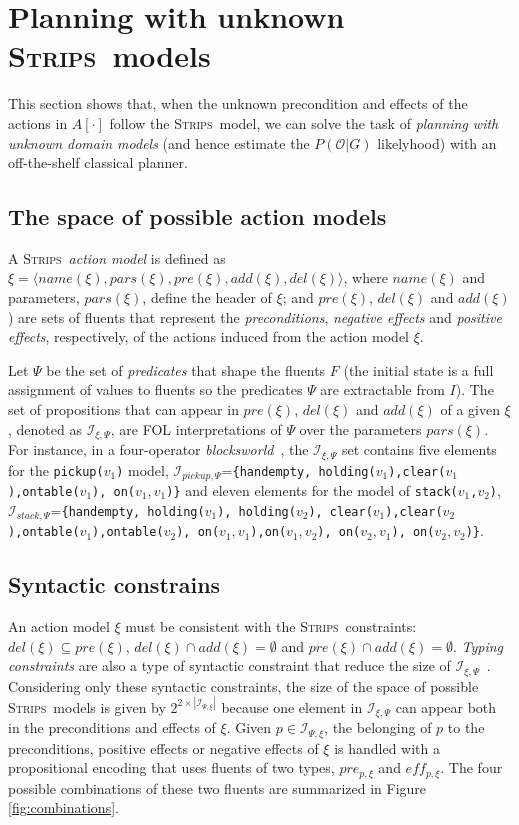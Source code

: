 \documentclass[letterpaper]{article} %
\newcommand{\tup}[1]{{\langle #1 \rangle}}
\newcommand{\strips}{\textsc{Strips}}     %
\begin{document}
\section{Planning with unknown \strips\ models}
\label{sec:planning}
This section shows that, when the unknown precondition and effects of the actions in $A[\cdot]$ follow the \strips\ model, we can solve the task of {\em planning with unknown domain models} (and hence estimate the $P(\mathcal{O}|G)$ likelyhood) with an off-the-shelf classical planner.

\subsection{The space of possible action models}
A \strips\ \emph{action model} is defined as $\xi=\tup{name(\xi),pars(\xi),pre(\xi),add(\xi),del(\xi)}$, where $name(\xi)$ and parameters, $pars(\xi)$, define the header of $\xi$; and $pre(\xi)$, $del(\xi)$ and $add(\xi)$) are sets of fluents that represent the {\em preconditions}, {\em negative effects} and {\em positive effects}, respectively, of the actions induced from the action model $\xi$.

Let $\Psi$ be the set of {\em predicates} that shape the fluents $F$ (the initial state is a full assignment of values to fluents so the predicates $\Psi$ are extractable from $I$). The set of propositions that can appear in $pre(\xi)$, $del(\xi)$ and $add(\xi)$ of a given $\xi$, denoted as ${\mathcal I}_{\xi,\Psi}$, are FOL interpretations of $\Psi$ over the parameters $pars(\xi)$. For instance, in a four-operator {\em blocksworld}~\cite{slaney2001blocks}, the ${\mathcal I}_{\xi,\Psi}$ set contains five elements for the {\small \tt pickup($v_1$)} model, ${\mathcal I}_{pickup,\Psi}$={\small\tt\{handempty, holding($v_1$),clear($v_1$),ontable($v_1$), on($v_1,v_1$)\}} and eleven elements for the model of {\small \tt stack($v_1$,$v_2$)}, ${\mathcal I}_{stack,\Psi}$={\small\tt\{handempty, holding($v_1$), holding($v_2$), clear($v_1$),clear($v_2$),ontable($v_1$),ontable($v_2$), on($v_1,v_1$),on($v_1,v_2$), on($v_2,v_1$), on($v_2,v_2$)\}}. 

\subsection{Syntactic constrains}
An action model $\xi$ must be consistent with the \strips\ constraints: $del(\xi)\subseteq pre(\xi)$, $del(\xi)\cap add(\xi)=\emptyset$ and $pre(\xi)\cap add(\xi)=\emptyset$. {\em Typing constraints} are also a type of syntactic constraint that reduce the size of ${\mathcal I}_{\xi,\Psi}$~\cite{mcdermott1998pddl}. Considering only these syntactic constraints, the size of the space of possible \strips\ models is given by $2^{2\times|{\mathcal I}_{\Psi,\xi}|}$ because one element in $\mathcal{I}_{\xi,\Psi}$ can appear both in the preconditions and effects of $\xi$. Given $p \in \mathcal{I}_{\Psi,\xi}$, the belonging of $p$ to the preconditions, positive effects or negative effects of $\xi$ is handled with a propositional encoding that uses fluents of two types, $pre_{p,\xi}$ and $eff_{p,\xi}$. The four possible combinations of these two fluents are summarized in Figure \ref{fig:combinations}. 
\end{document}
